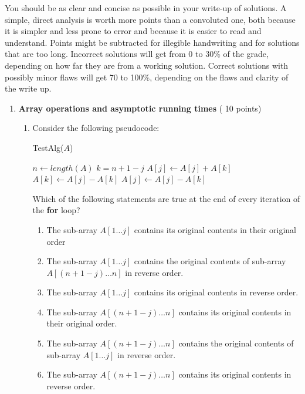 \documentclass[11pt]{article}
\newcommand{\floor}[1]{\lfloor {#1} \rfloor}
\begin{document}
You should be as clear and concise as possible in your write-up of
solutions. 
A simple, direct analysis is worth more points than a
convoluted one, both because it is simpler and less prone to error and
because it is easier to read and understand. Points might be
subtracted for illegible handwriting and for solutions that are too
long. Incorrect solutions will get from 0 to 30\% of the grade,
depending on how far they are from a working solution. Correct
solutions with possibly minor flaws will get 70 to 100\%, depending on
the flaws and clarity of the write up.


\newpage
\begin{enumerate}

  

\item \textbf{Array operations and asymptotic running times} ( 10 points) 
      \begin{enumerate}
      \item 
   Consider the following pseudocode:

    \begin{algorithm}[H]
      \caption{TestAlg($A$)} 
      $n \gets length(A)$ \;
      \For{$j\gets 1$ to $\floor{\frac n 2}$} 
      {
        $k= n+1-j$\;
        $ A[j] \gets A[j]+A[k]$     \;
        $ A[k] \gets A[j]-A[k] $ \;
        $A[j] \gets A[j]-A[k]$ \;
      }
    \end{algorithm}


Which of the following statements are true at the end of every iteration of the \textbf{for} loop?
\begin{enumerate}
\item The sub-array $A[1\ldots j]$ contains its original contents in
  their original
  order 
\item The sub-array $A[1\ldots j]$ contains the original contents of
  sub-array \\
  $A[(n+1-j)\ldots n]$ in reverse order.
\item The sub-array $A[1\ldots j]$
  contains its original contents in reverse order.
\item The sub-array
  $A[(n+1-j)\ldots n]$ contains its original contents in their original order.

  \item The sub-array $A[(n+1-j)\ldots n]$ contains the original contents of
  sub-array $A[1\ldots j]$ in reverse order.
\item  The sub-array $A[(n+1-j)\ldots n]$
  contains its original contents in reverse order.
\end{enumerate}


\end{enumerate}
\end{enumerate}
\end{document}
